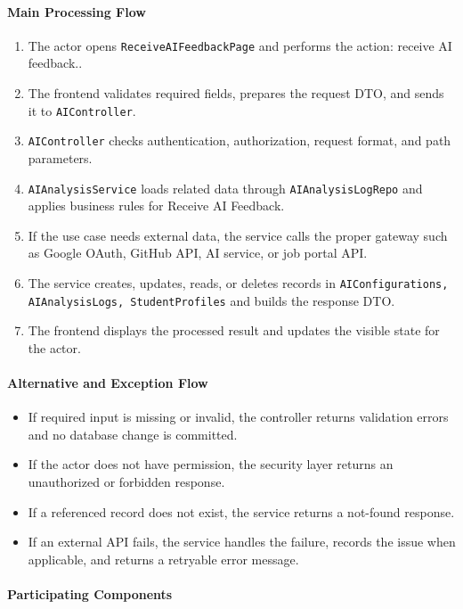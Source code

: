 \paragraph{Main Processing Flow}

\begin{enumerate}
    \item The actor opens \texttt{ReceiveAIFeedbackPage} and performs the action: receive AI feedback..
    \item The frontend validates required fields, prepares the request DTO, and sends it to \texttt{AIController}.
    \item \texttt{AIController} checks authentication, authorization, request format, and path parameters.
    \item \texttt{AIAnalysisService} loads related data through \texttt{AIAnalysisLogRepo} and applies business rules for Receive AI Feedback.
    \item If the use case needs external data, the service calls the proper gateway such as Google OAuth, GitHub API, AI service, or job portal API.
    \item The service creates, updates, reads, or deletes records in \texttt{AIConfigurations, AIAnalysisLogs, StudentProfiles} and builds the response DTO.
    \item The frontend displays the processed result and updates the visible state for the actor.
\end{enumerate}

\paragraph{Alternative and Exception Flow}

\begin{itemize}
    \item If required input is missing or invalid, the controller returns validation errors and no database change is committed.
    \item If the actor does not have permission, the security layer returns an unauthorized or forbidden response.
    \item If a referenced record does not exist, the service returns a not-found response.
    \item If an external API fails, the service handles the failure, records the issue when applicable, and returns a retryable error message.
\end{itemize}

\paragraph{Participating Components}


